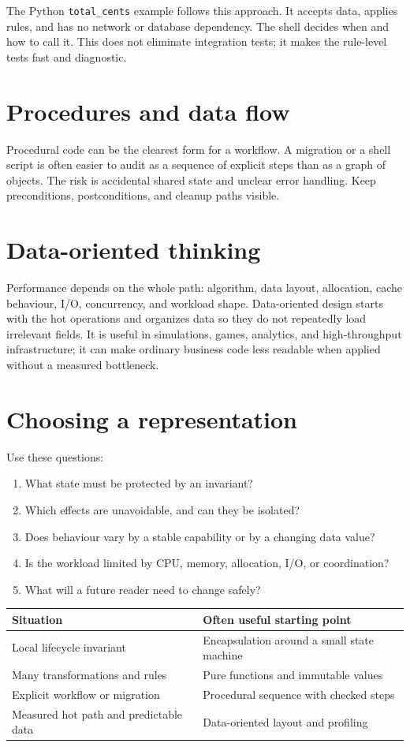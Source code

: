 The Python \texttt{total\_cents} example follows this approach. It accepts data, applies
rules, and has no network or database dependency. The shell decides when and how
to call it. This does not eliminate integration tests; it makes the rule-level
tests fast and diagnostic.

\section{Procedures and data flow}
Procedural code can be the clearest form for a workflow. A migration or a shell
script is often easier to audit as a sequence of explicit steps than as a graph
of objects. The risk is accidental shared state and unclear error handling. Keep
preconditions, postconditions, and cleanup paths visible.

\section{Data-oriented thinking}
Performance depends on the whole path: algorithm, data layout, allocation,
cache behaviour, I/O, concurrency, and workload shape. Data-oriented design
starts with the hot operations and organizes data so they do not repeatedly
load irrelevant fields. It is useful in simulations, games, analytics, and
high-throughput infrastructure; it can make ordinary business code less
readable when applied without a measured bottleneck.

\section{Choosing a representation}
Use these questions:

\begin{enumerate}
  \item What state must be protected by an invariant?
  \item Which effects are unavoidable, and can they be isolated?
  \item Does behaviour vary by a stable capability or by a changing data value?
  \item Is the workload limited by CPU, memory, allocation, I/O, or coordination?
  \item What will a future reader need to change safely?
\end{enumerate}

\noindent\begin{tabularx}{\textwidth}{@{}p{}X@{}}
\toprule
Situation & Often useful starting point \\
\midrule
Local lifecycle invariant & Encapsulation around a small state machine \\
Many transformations and rules & Pure functions and immutable values \\
Explicit workflow or migration & Procedural sequence with checked steps \\
Measured hot path and predictable data & Data-oriented layout and profiling \\
\bottomrule
\end{tabularx}

